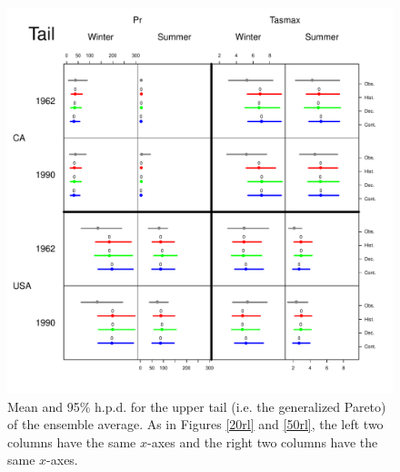 \begin{figure}
\begin{center}
 \includegraphics[scale=0.61]{figs/tail.pdf}
\end{center}
\caption{Mean and 95\% h.p.d. for the upper tail (i.e. the generalized Pareto) of the ensemble average. As in Figures \ref{20rl} and \ref{50rl}, the left two columns have the same $x$-axes and the right two columns have the same $x$-axes.}
\label{tail}
\end{figure}

